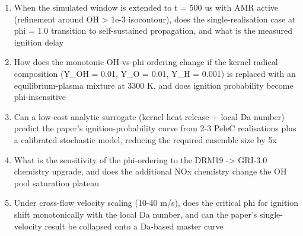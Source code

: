 \begin{enumerate}[leftmargin=1.6em,itemsep=0.2em,topsep=0.2em,label=Q\arabic*.]
\item When the simulated window is extended to t = 500 us with AMR active (refinement around OH \textgreater{} 1e-3 isocontour), does the single-realisation case at phi = 1.0 transition to self-sustained propagation, and what is the measured ignition delay
\item How does the monotonic OH-vs-phi ordering change if the kernel radical composition (Y\_OH = 0.01, Y\_O = 0.01, Y\_H = 0.001) is replaced with an equilibrium-plasma mixture at 3300 K, and does ignition probability become phi-insensitive
\item Can a low-cost analytic surrogate (kernel heat release + local Da number) predict the paper's ignition-probability curve from 2-3 PeleC realisations plus a calibrated stochastic model, reducing the required ensemble size by 5x
\item What is the sensitivity of the phi-ordering to the DRM19 -\textgreater{} GRI-3.0 chemistry upgrade, and does the additional NOx chemistry change the OH pool saturation plateau
\item Under cross-flow velocity scaling (10-40 m/s), does the critical phi for ignition shift monotonically with the local Da number, and can the paper's single-velocity result be collapsed onto a Da-based master curve
\end{enumerate}

